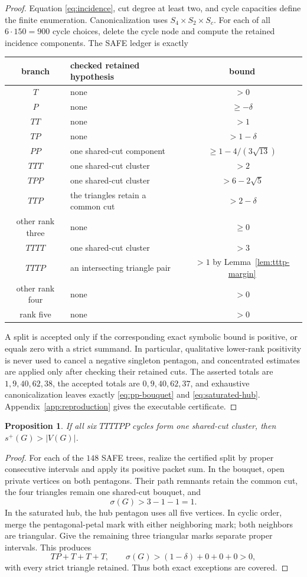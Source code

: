\documentclass[11pt]{article}
\newtheorem{proposition}[theorem]{Proposition}
\newcommand{\spE}{s^+}
\newcommand{\sig}{\sigma}
\begin{document}
\begin{proof}
Equation \eqref{eq:incidence}, cut degree at least two, and cycle capacities
define the finite enumeration.  Canonicalization uses
$S_4\times S_2\times S_c$.  For each of all $6\cdot150=900$ cycle choices,
delete the cycle node and compute the retained incidence components.  The SAFE
ledger is exactly
\begin{center}
\renewcommand{\arraystretch}{1.08}
\begin{tabular}{c l c}
branch&checked retained hypothesis&bound\\ \hline
$T$&none&$>0$\\
$P$&none&$\geq-\delta$\\
$TT$&none&$>1$\\
$TP$&none&$>1-\delta$\\
$PP$&one shared-cut component&$\geq1-4/(3\sqrt{13})$\\
$TTT$&one shared-cut cluster&$>2$\\
$TPP$&one shared-cut cluster&$>6-2\sqrt5$\\
$TTP$&the triangles retain a common cut&$>2-\delta$\\
other rank three&none&$\geq0$\\
$TTTT$&one shared-cut cluster&$>3$\\
$TTTP$&an intersecting triangle pair&$>1$ by Lemma~\ref{lem:tttp-margin}\\
other rank four&none&$>0$\\
rank five&none&$>0$
\end{tabular}
\end{center}
A split is accepted only if the corresponding exact symbolic bound is positive, or equals zero
with a strict summand.  In particular, qualitative lower-rank positivity is
never used to cancel a negative singleton pentagon, and concentrated estimates
are applied only after checking their retained cuts.  The asserted totals are
$1,9,40,62,38$, the accepted totals are $0,9,40,62,37$, and exhaustive
canonicalization leaves exactly \eqref{eq:pp-bouquet} and
\eqref{eq:saturated-hub}.  Appendix~\ref{app:reproduction} gives the executable
certificate.
\end{proof}

\begin{proposition}\label{prop:shared-ttttpp}
If all six $TTTTPP$ cycles form one shared-cut cluster, then
$\spE(G)>|V(G)|$.
\end{proposition}
\begin{proof}
For each of the $148$ SAFE trees, realize the certified split by proper
consecutive intervals and apply its positive packet sum.  In the bouquet,
open private vertices on both pentagons.  Their path remnants retain the common
cut, the four triangles remain one shared-cut bouquet, and
\[
 \sig(G)>3-1-1=1.
\]
In the saturated hub, the hub pentagon uses all five vertices.  In cyclic
order, merge the pentagonal-petal mark with either neighboring mark; both
neighbors are triangular.  Give the remaining three triangular marks separate
proper intervals.  This produces
\[
 TP+T+T+T,
 \qquad \sig(G)>(1-\delta)+0+0+0>0,
\]
with every strict triangle retained.  Thus both exact exceptions are covered.
\end{proof}
\end{document}
